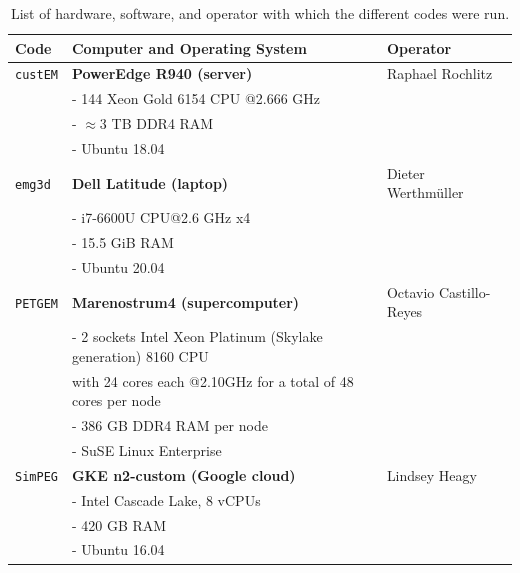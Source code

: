 \documentclass[extra, camera,%
]{gji}
\newcommand{\emg}[2]{\texttt{emg#1#2}\xspace}
\newcommand{\simpeg}{\texttt{SimPEG}\xspace}
\newcommand{\custem}{\texttt{custEM}\xspace}
\newcommand{\petgem}{\texttt{PETGEM}\xspace}
\begin{document}
%
\begin{table}
\begin{minipage}{14cm}
  \centering
  \caption{List of hardware, software, and operator with which the different codes were run.}
\label{tbl:machines}
  \begin{tabularx}{\linewidth}{lXl}
  \toprule
  Code & Computer and Operating System & Operator \\
  \midrule
  \custem & \textbf{PowerEdge R940 (server)}                  & Raphael Rochlitz \\
          & - 144 Xeon Gold 6154 CPU @2.666 GHz               & \\
          & - $\approx3$ TB DDR4 RAM                          & \\
          & - Ubuntu 18.04                                    & \\[.5em]
  \emg3d  & \textbf{Dell Latitude (laptop)}                   & Dieter Werthmüller \\
          & - i7-6600U CPU@2.6 GHz x4                         & \\
          & - 15.5 GiB RAM                                    & \\
          & - Ubuntu 20.04                                    & \\[.5em]
  \petgem & \textbf{Marenostrum4 (supercomputer)}             & Octavio Castillo-Reyes \\
          & - 2 sockets Intel Xeon Platinum (Skylake generation) 8160 CPU & \\
          & \phantom{-} with 24 cores each @2.10GHz for a total of 48 cores per node & \\
          & - 386 GB DDR4 RAM per node                        & \\
          & - SuSE Linux Enterprise                           & \\[.5em]
  \simpeg & \textbf{GKE n2-custom (Google cloud)}             & Lindsey Heagy \\
          & - Intel Cascade Lake, 8 vCPUs                     & \\
          & - 420 GB RAM                                      & \\
          & - Ubuntu 16.04                                    & \\
%
  \bottomrule
\end{tabularx}
\end{minipage}
\end{table}
%
\end{document}
